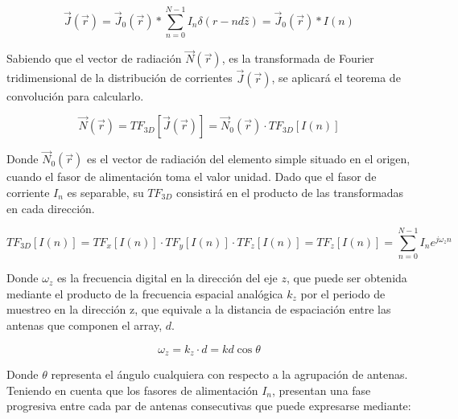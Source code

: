 \begin{equation}
	\vec{J}\left ( \vec{r} \right )=\vec{J}_{0}\left ( \vec{r} \right ) \ast \sum_{n=0}^{N-1}I_{n}\delta (r-nd\hat{z})=\vec{J}_{0}\left ( \vec{r} \right )\ast I(n)
	\label{eq:conv}
\end{equation}

\par Sabiendo que el vector de radiación $\vec{N}\left ( \vec{r} \right )$, es la transformada de Fourier tridimensional de la distribución de corrientes $\vec{J}\left ( \vec{r} \right )$, se aplicará el teorema de convolución para calcularlo.

\begin{equation}
	\vec{N}\left ( \vec{r} \right )=TF_{3D}\left [\vec{J}\left ( \vec{r} \right )  \right ]=\vec{N}_{0}\left ( \vec{r} \right )\cdot TF_{3D}\left [ I(n)   \right ]
	\label{eq:3d}
\end{equation}

\par Donde $\vec{N}_{0}\left ( \vec{r} \right )$ es el vector de radiación del elemento simple situado en el origen, cuando el fasor de alimentación toma el valor unidad. Dado que el fasor de corriente $I_{n}$  es separable, su $TF_{3D}$ consistirá en el producto de las transformadas en cada dirección.


\begin{equation}
	TF_{3D}\left [ I(n)   \right ]= TF_{x}\left [ I(n)   \right ]\cdot TF_{y}\left [ I(n)   \right ]\cdot TF_{z}\left [ I(n)   \right ] = TF_{z}\left [ I(n)   \right ] = \sum_{n=0}^{N-1}I_{n} e^{j\omega _{z}n}
	\label{eq:direccional}
\end{equation}

\par Donde $\omega _{z}$ es la frecuencia digital en la dirección del eje $z$, que puede ser obtenida mediante el producto de la frecuencia espacial analógica $k_{z}$  por el periodo de muestreo en la dirección z, que equivale a la distancia de espaciación entre las antenas que componen el array, $d$. 

\begin{equation}
	\omega_{z} = k_{z}\cdot d = k d \cos {\theta } 
	\label{eq:frecdigital}
\end{equation}

\par Donde $\theta$ representa el ángulo cualquiera con respecto a la agrupación de antenas. Teniendo en cuenta que los fasores de alimentación $I_{n}$, presentan una fase progresiva entre cada par de antenas consecutivas que puede expresarse mediante: 

